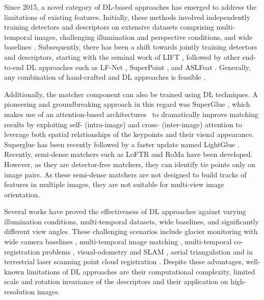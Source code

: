 Since 2015, a novel category of DL-based approaches has emerged to address the limitations of existing features.
Initially, these methods involved independently training detectors and descriptors on extensive datasets comprising multi-temporal images, challenging illumination and perspective conditions, and wide baselines \citep{mishchuk2018working}.
Subsequently, there has been a shift towards jointly training detectors and descriptors, starting with the seminal work of LIFT \citep{yi2016lift}, followed by other end-to-end DL approaches such as LF-Net \citep{ono2018lfnet}, SuperPoint \citep{DeTone_2018}, and ASLFeat \citep{luo2020aslfeat}.
Generally, any combination of hand-crafted and DL approaches is feasible \citep{jin_image_2021}.

Additionally, the matcher component can also be trained using DL techniques.
A pioneering and groundbreaking approach in this regard was SuperGlue \citep{sarlin2020superglue}, which makes use of an attention-based architectures~\citep{vaswani2023attention} to dramatically improve matching results by exploiting self- (intra-image) and cross- (inter-image) attention to leverage both spatial relationships of the keypoints and their visual appearance.
Superglue has been recently followed by a faster update named LightGlue \citep{lindenberger2023lightglue}. 
Recently, semi-dense matchers such as LoFTR \citep{sun2021_loftr} and RoMa \citep{edstedt2023roma} have been developed. 
However, as they are detector-free matchers, they can identify tie points only on image pairs. 
As these semi-dense matchers are not designed to build tracks of features in multiple images, they are not suitable for multi-view image orientation.

Several works have proved the effectiveness of DL approaches against varying illumination conditions, multi-temporal datasets, wide baselines, and significantly different view angles.
These challenging scenarios include glacier monitoring with wide camera baselines \citep{ioli2023_replicable, ioli2024deep}, 
multi-temporal image matching \citep{Maiwald2023_HAI-SFM}, 
multi-temporal co-registration problems \citep{Maiwald2021_Historical, Morelli2022_photogrnowandthen}, 
visual-odometry and SLAM \citep{morelli2023colmap}, aerial triangulation \citep{remondino2022_at_with_dl} 
and in terrestrial laser scanning point cloud registration \citep{Markiewicz2023}.
Despite these advantages, well-known limitations of DL approaches are their computational complexity, 
limited scale and rotation invariance of the descriptors and their application on high-resolution images.

